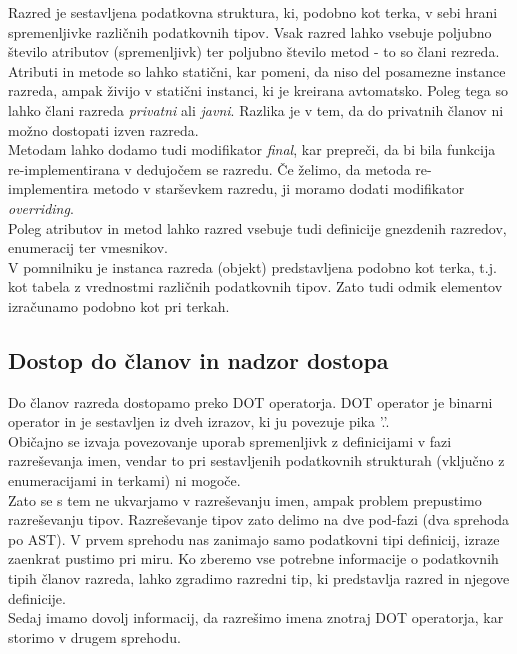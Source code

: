 \documentclass[a4paper, 12p]{book}
\begin{document}
Razred je sestavljena podatkovna struktura, ki, podobno kot terka, v sebi hrani spremenljivke različnih podatkovnih tipov. Vsak razred lahko vsebuje poljubno število atributov (spremenljivk) ter poljubno število metod - to so člani rezreda. \\
\indent Atributi in metode so lahko statični, kar pomeni, da niso del posamezne instance razreda, ampak živijo v statični instanci, ki je kreirana avtomatsko. Poleg tega so lahko člani razreda \textit{privatni} ali \textit{javni}. Razlika je v tem, da do privatnih članov ni možno dostopati izven razreda.\\
\indent Metodam lahko dodamo tudi modifikator \textit{final}, kar prepreči, da bi bila funkcija re-implementirana v dedujočem se razredu. Če želimo, da metoda re-implementira metodo v starševkem razredu, ji moramo dodati modifikator \textit{overriding}. \\
\indent Poleg atributov in metod lahko razred vsebuje tudi definicije gnezdenih razredov, enumeracij ter vmesnikov.\\
\indent V pomnilniku je instanca razreda (objekt) predstavljena podobno kot terka, t.j. kot tabela z vrednostmi različnih podatkovnih tipov. Zato tudi odmik elementov izračunamo podobno kot pri terkah.

\subsection{Dostop do članov in nadzor dostopa}

Do članov razreda dostopamo preko DOT operatorja. DOT operator je binarni operator in je sestavljen iz dveh izrazov, ki ju povezuje pika '.'. \\
\indent Običajno se izvaja povezovanje uporab spremenljivk z definicijami v fazi razreševanja imen, vendar to pri sestavljenih podatkovnih strukturah (vključno z enumeracijami in terkami) ni mogoče.\\
\indent Zato se s tem ne ukvarjamo v razreševanju imen, ampak problem prepustimo razreševanju tipov. Razreševanje tipov zato delimo na dve pod-fazi (dva sprehoda po AST). V prvem sprehodu nas zanimajo samo podatkovni tipi definicij, izraze zaenkrat pustimo pri miru. Ko zberemo vse potrebne informacije o podatkovnih tipih članov razreda, lahko zgradimo razredni tip, ki predstavlja razred in njegove definicije. \\
\indent Sedaj imamo dovolj informacij, da razrešimo imena znotraj DOT operatorja, kar storimo v drugem sprehodu.\\
\end{document}
